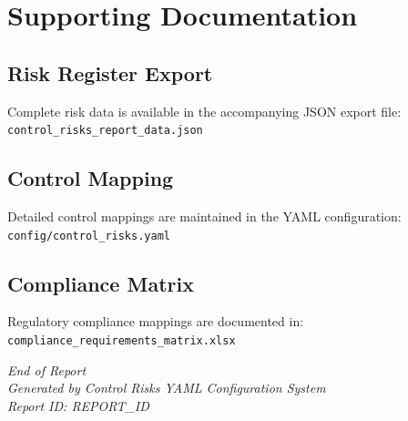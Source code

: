 \documentclass[11pt,a4paper]{article}
\newcommand{\reportid}{{{REPORT_ID}}}
\begin{document}
\section{Supporting Documentation}

\subsection{Risk Register Export}
Complete risk data is available in the accompanying JSON export file:
\texttt{control\_risks\_report\_data.json}

\subsection{Control Mapping}
Detailed control mappings are maintained in the YAML configuration:
\texttt{config/control\_risks.yaml}

\subsection{Compliance Matrix}
Regulatory compliance mappings are documented in:
\texttt{compliance\_requirements\_matrix.xlsx}

\vfill
\begin{center}
\textcolor{corporategray}{\small\textit{End of Report}}\\[0.5cm]
\textcolor{corporategray}{\small\textit{Generated by Control Risks YAML Configuration System}}\\
\textcolor{corporategray}{\small\textit{Report ID: \reportid}}
\end{center}
\end{document}
